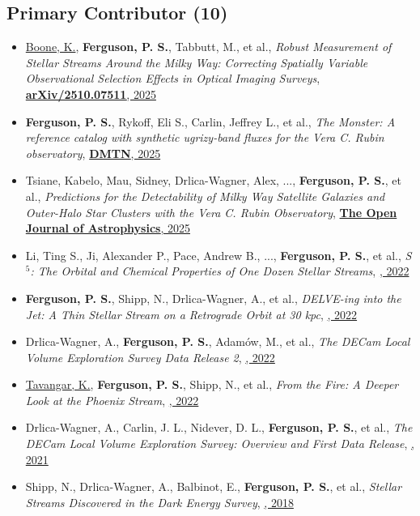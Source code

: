 \renewcommand{\labelitemi}{$$}
\subsection{Primary Contributor  (10)}
\begin{itemize}[itemsep=1pt]
    \item \underline{{Boone}, K.}, \textbf{Ferguson, P. S.}, {Tabbutt}, M., et al., \textit{{Robust Measurement of Stellar Streams Around the Milky Way: Correcting Spatially Variable Observational Selection Effects in Optical Imaging Surveys}}, \href{https://ui.adsabs.harvard.edu/abs/2025arXiv251007511B}{\textbf{arXiv/2510.07511}, 2025}
    \item \textbf{Ferguson, P. S.}, {Rykoff}, Eli S., {Carlin}, Jeffrey L., et al., \textit{The Monster: A reference catalog with synthetic ugrizy-band fluxes for the Vera C. Rubin observatory}, \href{https://doi.org/10.71929/rubin/2583688}{\textbf{DMTN}, 2025}
    \item {Tsiane}, Kabelo, {Mau}, Sidney, {Drlica-Wagner}, Alex, ..., \textbf{Ferguson, P. S.}, et al., \textit{{Predictions for the Detectability of Milky Way Satellite Galaxies and Outer-Halo Star Clusters with the Vera C. Rubin Observatory}}, \href{https://ui.adsabs.harvard.edu/abs/2025OJAp....8E..89T}{\textbf{The Open Journal of Astrophysics}, 2025}
    \item {Li}, Ting S., {Ji}, Alexander P., {Pace}, Andrew B., ..., \textbf{Ferguson, P. S.}, et al., \textit{{S $^{5}$: The Orbital and Chemical Properties of One Dozen Stellar Streams}}, \href{https://ui.adsabs.harvard.edu/abs/2022ApJ...928...30L}{\textbf{\apj}, 2022}
    \item \textbf{Ferguson, P. S.}, {Shipp}, N., {Drlica-Wagner}, A., et al., \textit{{DELVE-ing into the Jet: A Thin Stellar Stream on a Retrograde Orbit at 30 kpc}}, \href{https://ui.adsabs.harvard.edu/abs/2022AJ....163...18F}{\textbf{\aj}, 2022}
    \item {Drlica-Wagner}, A., \textbf{Ferguson, P. S.}, {Adam{\'o}w}, M., et al., \textit{{The DECam Local Volume Exploration Survey Data Release 2}}, \href{https://ui.adsabs.harvard.edu/abs/2022ApJS..261...38D}{\textbf{\apjs}, 2022}
    \item \underline{{Tavangar}, K.}, \textbf{Ferguson, P. S.}, {Shipp}, N., et al., \textit{{From the Fire: A Deeper Look at the Phoenix Stream}}, \href{https://ui.adsabs.harvard.edu/abs/2022ApJ...925..118T}{\textbf{\apj}, 2022}
    \item {Drlica-Wagner}, A., {Carlin}, J. L., {Nidever}, D. L., \textbf{Ferguson, P. S.}, et al., \textit{{The DECam Local Volume Exploration Survey: Overview and First Data Release}}, \href{https://ui.adsabs.harvard.edu/abs/2021ApJS..256....2D}{\textbf{\apjs}, 2021}
    \item {Shipp}, N., {Drlica-Wagner}, A., {Balbinot}, E., \textbf{Ferguson, P. S.}, et al., \textit{{Stellar Streams Discovered in the Dark Energy Survey}}, \href{https://ui.adsabs.harvard.edu/abs/2018ApJ...862..114S}{\textbf{\apj}, 2018}
\end{itemize}
